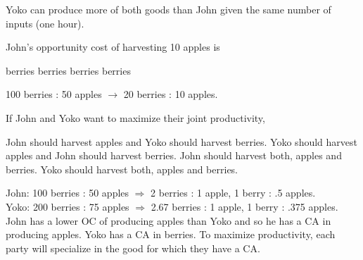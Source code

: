 \documentclass[addpoints,11pt]{exam}
\theoremstyle{definition}
\begin{document}
\begin{questions}
		\begin{solution}
			Yoko can produce more of both goods than John given the same number of inputs (one hour).
		\end{solution}
		
	\question John's opportunity cost of harvesting 10 apples is
		\begin{choices}
			 berries
			 berries
			 berries
			 berries
		\end{choices}
		
		\begin{solution}
			100 berries : 50 apples $\rightarrow$ 20 berries : 10 apples.
		\end{solution}
		
\newpage
		
	\question \label{blah2} If John and Yoko want to maximize their joint productivity,
		\begin{choices}
			\CorrectChoice John should harvest apples and Yoko should harvest berries.
			\choice Yoko should harvest apples and John should harvest berries.
			\choice John should harvest both, apples and berries.
			\choice Yoko should harvest both, apples and berries.
		\end{choices}
		
		\begin{solution}
			John: 100 berries : 50 apples $\Rightarrow$ 2 berries : 1 apple, 1 berry : .5 apples. 
		\\ Yoko: 200 berries : 75 apples $\Rightarrow$ 2.67 berries : 1 apple, 1 berry : .375 apples. John has a lower OC of producing apples than Yoko and so he has a CA in producing apples. Yoko has a CA in berries. To maximize productivity, each party will specialize in the good for which they have a CA.
		\end{solution}
				
		

		

		
		

\end{questions}
\end{document}

